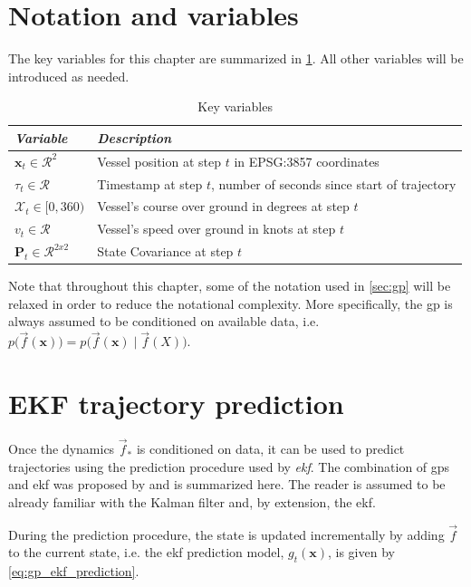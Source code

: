 \section{Notation and variables}
The key variables for this chapter are summarized in \cref{table:dyngp_key_variables}. All other variables will be introduced as needed.
\begin{table}[h]
    \centering
    \begin{tabular}{ll}
        \textit{\textbf{Variable}}               & \textit{\textbf{Description}}                          \\ \hline
        $\boldsymbol{x}_t \in \mathcal{R}^2$     & Vessel position at step $t$ in EPSG:3857 coordinates   \\
        $\tau_t \in \mathcal{R}$                 & Timestamp at step $t$, number of seconds since start of trajectory \\
        $\mathcal{X}_t \in [0, 360)$             & Vessel's course over ground in degrees at step $t$     \\
        $v_t \in \mathcal{R}$                    & Vessel's speed over ground in knots at step $t$        \\
        $\boldsymbol{P}_t \in \mathcal{R}^{2x2}$ & State Covariance at step $t$                           \\
    \end{tabular}
    \caption{Key variables}
    \label{table:dyngp_key_variables}
\end{table}

Note that throughout this chapter, some of the notation used in \cref{sec:gp} will be relaxed in order to reduce the notational complexity. More specifically, the \acrshort{gp} is always assumed to be conditioned on available data, i.e. $p\big(\vec{f}(\boldsymbol{x})\big) = p\big(\vec{f}(\boldsymbol{x}) \; | \; \vec{f}(X)\big)$. 

\section{EKF trajectory prediction}
Once the dynamics $\vec{f}_*$ is conditioned on data, it can be used to predict trajectories using the prediction procedure used by \textit{\acrfull{ekf}}. The combination of \acrshort{gp}s and \acrshort{ekf} was proposed by \cite{gpekf} and is summarized here. The reader is assumed to be already familiar with the Kalman filter and, by extension, the \acrshort{ekf}.

During the prediction procedure, the state is updated incrementally by adding $\vec{f}$ to the current state, i.e. the \acrshort{ekf} prediction model, $g_t(\boldsymbol{x})$, is given by \cref{eq:gp_ekf_prediction}.

